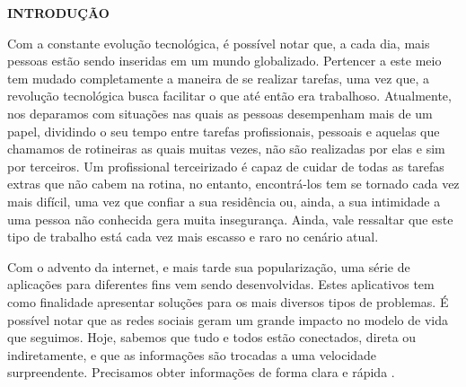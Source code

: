 \begin{flushleft}
  \vspace{1.2em}
  \textbf{\large INTRODUÇÃO}
  \vspace{2.9em}
\end{flushleft}
\thispagestyle{empty}


\par Com a constante evolução tecnológica, é possível notar que, a cada dia, mais pessoas estão sendo inseridas em um mundo globalizado. Pertencer a este meio tem mudado completamente a maneira de se realizar tarefas, uma vez que, a revolução tecnológica busca facilitar o que até então era trabalhoso. Atualmente, nos deparamos com situações nas quais as pessoas desempenham mais de um papel, dividindo o seu tempo entre tarefas profissionais, pessoais e aquelas que chamamos de rotineiras as quais muitas vezes, não são realizadas por elas e sim por terceiros. %
Um profissional terceirizado é capaz de cuidar de todas as tarefas extras que não cabem na rotina, no entanto, encontrá-los tem se tornado cada vez mais difícil, uma vez que confiar a sua residência ou, ainda, a sua intimidade a uma pessoa não conhecida gera muita insegurança. Ainda, vale ressaltar que este tipo de trabalho está cada vez mais escasso e raro no cenário atual.

\par Com o advento da internet, e mais tarde sua popularização, uma série de aplicações para diferentes fins vem sendo desenvolvidas. Estes aplicativos tem como finalidade apresentar soluções para os mais diversos tipos de problemas. É possível notar que as redes sociais geram um grande impacto no modelo de vida que seguimos. Hoje, sabemos que tudo e todos estão conectados, direta ou indiretamente, e que as informações são trocadas a uma velocidade surpreendente. Precisamos obter informações de forma clara e rápida \cite{barbosa_why_people_use_social_network}.

